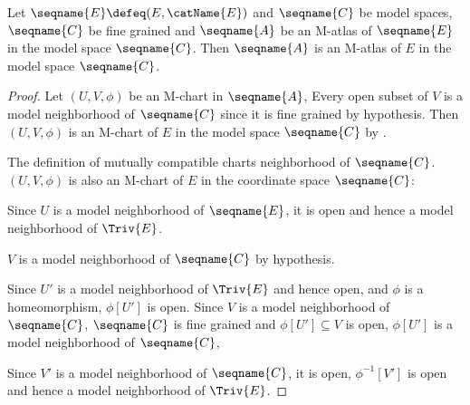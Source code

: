 \documentclass{article}
\begin{document}
\begin{lemma}
\label{lem:Func-M-Top}
Let $\seqname{E} \defeq (E,\catName{E})$ and $\seqname{C}$ be model
spaces, $\seqname{C}$ be fine grained and $\seqname{A}$ be an M-atlas of
$\seqname{E}$ in the model space $\seqname{C}$. Then
$\seqname{A}$ is an M-atlas of $E$ in the model space $\seqname{C}$.

\begin{proof}
Let $(U, V, \phi)$ be an M-chart in $\seqname{A}$, Every open subset of
$V$ is a model neighborhood of $\seqname{C}$ since it is fine grained by
hypothesis. Then $(U, V, \phi)$ is an M-chart of $E$ in the model space
$\seqname{C}$ by .

The definition of mutually compatible charts
neighborhood of $\seqname{C}$. $(U, V, \phi)$ is also an M-chart of $E$
in the coordinate space $\seqname{C}$:

Since $U$ is a model neighborhood of $\seqname{E}$, it is open and hence
a model neighborhood of $\Triv{E}$.

$V$ is a model neighborhood of $\seqname{C}$ by hypothesis.

Since $U'$ is a model neighborhood of $\Triv{E}$ and hence open, and
$\phi$ is a homeomorphism, $\phi[U']$ is open.
Since $V$ is a model neighborhood of $\seqname{C}$,
$\seqname{C}$ is fine grained and $\phi[U'] \subseteq V$ is open,
$\phi[U']$ is a model neighborhood of $\seqname{C}$,

Since $V'$ is a model neighborhood of $\seqname{C}$, it is open,
$\phi^{-1}[V']$ is open and hence a model neighborhood of $\Triv{E}$.
\end{proof}
\end{lemma}
\end{document}
